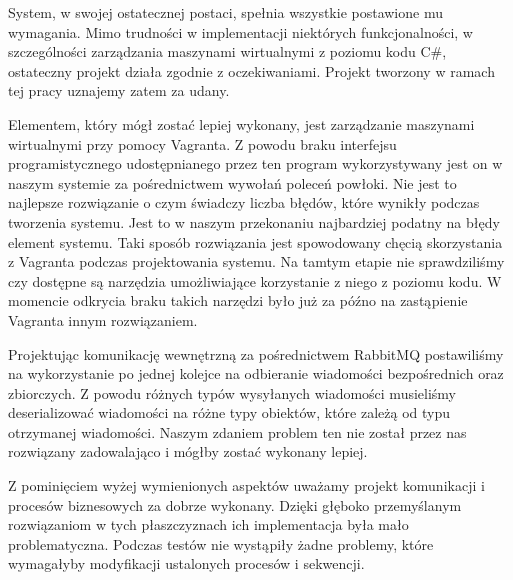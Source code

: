 \documentclass[../podsumowanie.tex]{subfiles}
\begin{document}
\label{final_system_form}

System, w swojej ostatecznej postaci, spełnia wszystkie postawione mu wymagania. Mimo trudności w implementacji niektórych funkcjonalności, w szczególności zarządzania maszynami wirtualnymi z poziomu kodu C\#, ostateczny projekt działa zgodnie z oczekiwaniami. Projekt tworzony w ramach tej pracy uznajemy zatem za udany.

Elementem, który mógł zostać lepiej wykonany, jest zarządzanie maszynami wirtualnymi przy pomocy Vagranta. Z powodu braku interfejsu programistycznego udostępnianego przez ten program wykorzystywany jest on w naszym systemie za pośrednictwem wywołań poleceń powłoki. Nie jest to najlepsze rozwiązanie o czym świadczy liczba błędów, które wynikły podczas tworzenia systemu. Jest to w naszym przekonaniu najbardziej podatny na błędy element systemu. Taki sposób rozwiązania jest spowodowany chęcią skorzystania z Vagranta podczas projektowania systemu. Na tamtym etapie nie sprawdziliśmy czy dostępne są narzędzia umożliwiające korzystanie z niego z poziomu kodu. W momencie odkrycia braku takich narzędzi było już za późno na zastąpienie Vagranta innym rozwiązaniem.

Projektując komunikację wewnętrzną za pośrednictwem RabbitMQ postawiliśmy na wykorzystanie po jednej kolejce na odbieranie wiadomości bezpośrednich oraz zbiorczych.
Z powodu różnych typów wysyłanych wiadomości musieliśmy deserializować wiadomości na różne typy obiektów, które zależą od typu otrzymanej wiadomości.
Naszym zdaniem problem ten nie został przez nas rozwiązany zadowalająco i mógłby zostać wykonany lepiej.

Z pominięciem wyżej wymienionych aspektów uważamy projekt komunikacji i procesów biznesowych za dobrze wykonany.
Dzięki głęboko przemyślanym rozwiązaniom w tych płaszczyznach ich implementacja była mało problematyczna.
Podczas testów nie wystąpiły żadne problemy, które wymagałyby modyfikacji ustalonych procesów i sekwencji.
\end{document}
